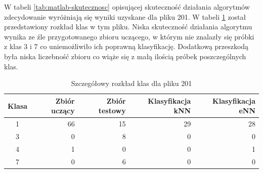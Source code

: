 W tabeli \ref{tab:matlab-skutecznosc} opisującej skuteczność działania algorytmów zdecydowanie wyróżniają się wyniki uzyskane dla pliku 201. W tabeli \ref{tab:matlab-plik201} został przedstawiony rozkład klas w tym pliku. Niska skuteczność działania algorytmu wynika ze źle przygotowanego zbioru uczącego, w którym nie znalazły się próbki z klas 3 i 7 co uniemożliwiło ich poprawną klasyfikację. Dodatkową przeszkodą była niska liczebność zbioru co wiąże się z małą ilością próbek poszczególnych klas.

\begin{table}[H]
	\centering
	\begin{tabular}{|c|r|r|r|r|}
		\hline
		
		Klasa & Zbiór uczący & Zbiór testowy & Klasyfikacja kNN & Klasyfikacja eNN \\
		\hline
		1 & 66 & 15 & 29 & 28 \\
		\hline 
		3 & 0 & 8 & 0 & 0 \\
		\hline
		4 & 1 & 0 & 0 & 1 \\
		\hline
		7 & 0 & 6 & 0 & 0 \\
		\hline
		
	\end{tabular}
	\caption{Szczegółowy rozkład klas dla pliku 201}
	\label{tab:matlab-plik201}
\end{table}




